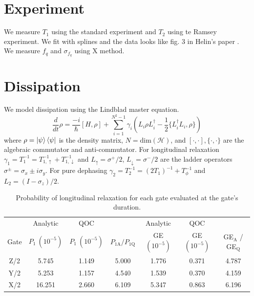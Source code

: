 \documentclass[
  amsfonts,
  amsmath,
  tbtags,
  amssymb,
  aps,
  nobibnotes,
  twocolumn,
  superscriptaddress,
]{revtex4-2}
\begin{document}
\section{Experiment}
We measure $T_{1}$ using the standard experiment
and $T_{2}$ using te Ramsey experiment. We fit with splines
and the data looks like fig. 3 in Helin's paper \cite{zhang2020universal}.
We measure $f_{q}$ and $\sigma_{f_{q}}$ using X method.


\section{Dissipation}
We model dissipation using the Lindblad master
equation. 
\begin{equation}
  \frac{d}{dt} \rho = \frac{-i}{\hbar} [H, \rho] + \sum_{i = 1}^{N^{2} - 1} \gamma_{i} (L_{i} \rho L_{i}^{\dagger} - \frac{1}{2} \{L_{i}^{\dagger} L_{i}, \rho\})
\end{equation}
where $\rho = \ket{\psi}\bra{\psi}$ is the density matrix, $N = \textrm{dim}(\mathcal{H})$,
and $[\cdot, \cdot], \{\cdot, \cdot \}$ are the algebraic commutator and anti-commutator.
For longitudinal relaxation $\gamma_{1} = T_{1}^{-1} = T_{1, \uparrow}^{-1} + T_{1, \downarrow}^{-1}$
and $L_{\uparrow} = \sigma^{+}/2$,
$L_{\downarrow} = \sigma^{-}/2$
are the ladder operators $\sigma^{\pm} = \sigma_{x} \pm i \sigma_{y}$. For pure dephasing
$\gamma_{2} = T_{2}^{-1} = (2 T_{1})^{-1} + T_{\phi}^{-1}$ and
$L_{2} = (I - \sigma_{z})/2$.

\begin{table}[ht]
  \begin{tabular}{c | c | c | c | c | c | c}
         & Analytic & QOC & & Analytic & QOC & \\
    Gate & $P_{1}\ (10^{-5})$ & $P_{1}\ (10^{-5})$ & $P_{1\textrm{A}} / P_{1\textrm{Q}}$
    & GE $(10^{-5})$ & GE $(10^{-5})$ & GE$_{\textrm{A}}$ / GE$_{\textrm{Q}}$\\
    \hline
    Z/2 & 5.745  & 1.149 & 5.000 & 1.776 & 0.371 & 4.787\\
    Y/2 & 5.253  & 1.157 & 4.540 & 1.539 & 0.370 & 4.159\\
    X/2 & 16.251 & 2.660 & 6.109 & 5.347 & 0.863 & 6.196\\
  \end{tabular}
  \caption{Probability of longitudinal relaxation for each gate
    evaluated at the gate's duration.}
\end{table}

\end{document}
